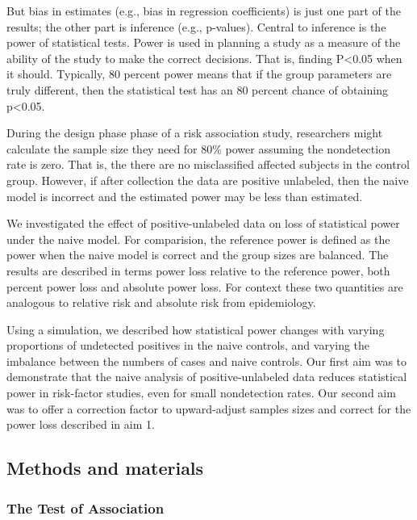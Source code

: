 \documentclass[
]{article}
\begin{document}
But bias in estimates (e.g., bias in regression coefficients) is just
one part of the results; the other part is inference (e.g., p-values).
Central to inference is the power of statistical tests. Power is used in
planning a study as a measure of the ability of the study to make the
correct decisions. That is, finding P\textless0.05 when it should.
Typically, 80 percent power means that if the group parameters are truly
different, then the statistical test has an 80 percent chance of
obtaining p\textless0.05.

During the design phase phase of a risk association study, researchers
might calculate the sample size they need for 80\% power assuming the
nondetection rate is zero. That is, the there are no misclassified
affected subjects in the control group. However, if after collection the
data are positive unlabeled, then the naive model is incorrect and the
estimated power may be less than estimated.

We investigated the effect of positive-unlabeled data on loss of
statistical power under the naive model. For comparision, the reference
power is defined as the power when the naive model is correct and the
group sizes are balanced. The results are described in terms power loss
relative to the reference power, both percent power loss and absolute
power loss. For context these two quantities are analogous to relative
risk and absolute risk from epidemiology.

Using a simulation, we described how statistical power changes with
varying proportions of undetected positives in the naive controls, and
varying the imbalance between the numbers of cases and naive controls.
Our first aim was to demonstrate that the naive analysis of
positive-unlabeled data reduces statistical power in risk-factor
studies, even for small nondetection rates. Our second aim was to offer
a correction factor to upward-adjust samples sizes and correct for the
power loss described in aim 1.

\newpage

\hypertarget{methods-and-materials}{%
\subsection{Methods and materials}\label{methods-and-materials}}

\hypertarget{the-test-of-association}{%
\subsubsection{The Test of Association}\label{the-test-of-association}}
\end{document}
